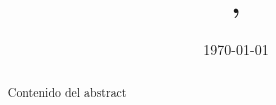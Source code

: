 \documentclass[letterpaper,12pt]{article}
\title{\TITULO}
\author{\href{\correoa}{\autora} %
\and \href{\correob}{\autorb} %
\and \href{\correoc}{\autorc} %
\and \href{\correod}{\autord} %
\and \href{\correoe}{\autore} %
}
\title{\Huge{\TITULO}\\
\large{\carrera, \campus}}
\date{\today}
\begin{document}
\maketitle

\thispagestyle{fancy} 

\begin{abstract}
Contenido del abstract
\end{abstract}



\section{}








\end{document}

